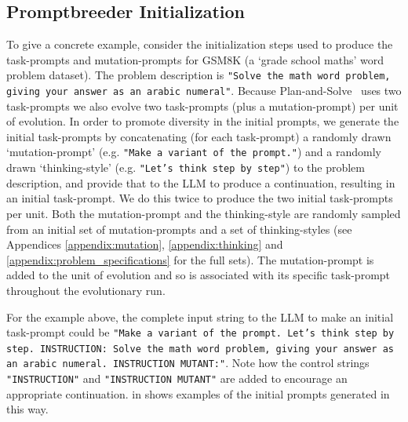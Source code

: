 \documentclass{article} %
\newcommand{\prompt}[1]{\footnotesize{\texttt{"#1"}}\normalsize}
\begin{document}
\subsection{Promptbreeder Initialization}
\label{sec:initialization}
To give a concrete example, consider the initialization steps used to produce the task-prompts and mutation-prompts for GSM8K (a `grade school maths' word problem dataset). The problem description is \prompt{Solve the math word problem, giving your answer as an arabic numeral}. Because Plan-and-Solve~\citep{DBLP:conf/acl/WangXLHLLL23} uses two task-prompts we also evolve two task-prompts (plus a mutation-prompt) per unit of evolution. In order to promote diversity in the initial prompts, we generate the initial task-prompts by concatenating (for each task-prompt) a randomly drawn `mutation-prompt' (e.g. \prompt{Make a variant of the prompt.}) and a randomly drawn `thinking-style'  (e.g. \prompt{Let's think step by step}) to the problem description, and provide that to the LLM to produce a continuation, resulting in an initial task-prompt. We do this twice to produce the two initial task-prompts per unit. Both the mutation-prompt and the thinking-style are randomly sampled from an initial set of mutation-prompts and a set of thinking-styles (see Appendices \ref{appendix:mutation}, \ref{appendix:thinking} and \ref{appendix:problem_specifications} for the full sets). The mutation-prompt is added to the unit of evolution and so is associated with its specific task-prompt throughout the evolutionary run. 

For the example above, the complete input string to the LLM to make an initial task-prompt could be \prompt{Make a variant of the prompt. Let's think step by step. INSTRUCTION: Solve the math word problem, giving your answer as an arabic numeral. INSTRUCTION MUTANT:}. Note how the control strings \prompt{INSTRUCTION} and \prompt{INSTRUCTION MUTANT} are added to encourage an appropriate continuation.  in  shows examples of the initial prompts generated in this way. 
\end{document}
